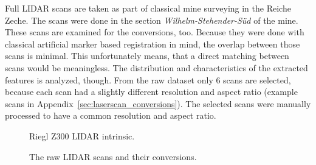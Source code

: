 Full \acrshort{LIDAR} scans are taken as part of classical mine surveying in the Reiche Zeche.
The scans were done in the section \emph{Wilhelm-Stehender-Süd} of the mine.
These scans are examined for the conversions, too.
Because they were done with classical artificial marker based registration in mind, the overlap between those scans is minimal.
This unfortunately means, that a direct matching between scans would be meaningless.
The distribution and characteristics of the extracted features is analyzed, though.
From the raw dataset only 6 scans are selected, because each scan had a slightly different resolution and aspect ratio (example scans in Appendix~\ref{sec:laserscan_conversions}).
The selected scans were manually processed to have a common resolution and aspect ratio.
\begin{figure}[H]
\CenterFloatBoxes%
\begin{floatrow}
    {\caption{Riegl Z300 \acrshort{LIDAR} intrinsic.}\label{tab:scan_intrinsic}}%
    {\caption{The raw \acrshort{LIDAR} scans and their conversions.}\label{fig:scans}}
\end{floatrow}
\end{figure}

